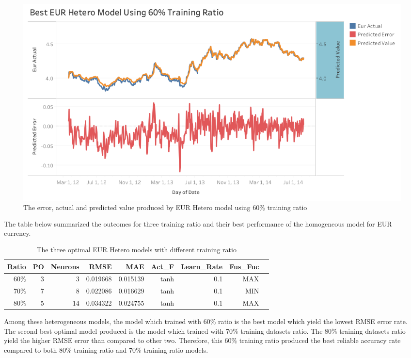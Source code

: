 {{{{{{{{{{{{{{{			\begin{figure}[hbt!]\centering
				\includegraphics[width=1\textwidth]{best_eur_hetero_APV_60}
				\caption{The error, actual and predicted value produced by EUR Hetero model using 60\% training ratio}
			\end{figure}
			
The table below summarized the outcomes for three training ratio and their best performance of the homogeneous model for EUR currency.
			
			\setlength{\tabcolsep}{0.5em} %
			{\renewcommand{\arraystretch}{1.2}
				
				\begin{table}[ht]
					\centering
					\begin{tabular}{@{}rrrrrrrrr@{}}
						\toprule
						\textbf{Ratio}&\textbf{PO}&\textbf{Neurons}& \textbf{RMSE} & \textbf{MAE} & \textbf{Act\_F} & \textbf{Learn\_Rate} &\textbf{ Fus\_Fuc}\\ 
						\midrule
						60\% & 3 & 3 & 0.019668 & 0.015139 & tanh & 0.1 & MAX \\
						70\% & 7 & 8 & 0.022086 & 0.016629 & tanh & 0.1 & MIN \\
						80\% & 5 & 14 & 0.034322 & 0.024755 & tanh & 0.1 & MAX \\
						\hline
					\end{tabular}
					\hspace*{1cm}
					\caption{The three optimal EUR Hetero models with different training ratio}
					
				\end{table}
Among these heterogeneous models, the model which trained with 60\% ratio is the best model which yield the lowest RMSE error rate. The second best optimal model produced is the model which trained with 70\% training datasets ratio. The 80\% training datasets ratio yield the higher RMSE error than compared to other two. Therefore, this 60\% training ratio produced the best reliable accuracy rate compared to both  80\% training ratio  and 70\% training ratio models.

}}}}}}}}}}}}}}}}
